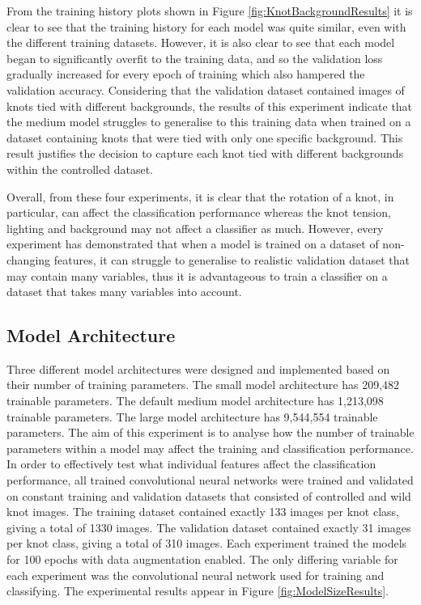 \documentclass{l4proj}
\begin{document}
From the training history plots shown in Figure \ref{fig:KnotBackgroundResults} it is clear to see that the training history for each model was quite similar, even with the different training datasets. However, it is also clear to see that each model began to significantly overfit to the training data, and so the validation loss gradually increased for every epoch of training which also hampered the validation accuracy. Considering that the validation dataset contained images of knots tied with different backgrounds, the results of this experiment indicate that the medium model struggles to generalise to this training data when trained on a dataset containing knots that were tied with only one specific background. This result justifies the decision to capture each knot tied with different backgrounds within the controlled dataset.

Overall, from these four experiments, it is clear that the rotation of a knot, in particular, can affect the classification performance whereas the knot tension, lighting and background may not affect a classifier as much. However, every experiment has demonstrated that when a model is trained on a dataset of non-changing features, it can struggle to generalise to realistic validation dataset that may contain many variables, thus it is advantageous to train a classifier on a dataset that takes many variables into account.  

\subsection{Model Architecture}
Three different model architectures were designed and implemented based on their number of training parameters.
The small model architecture has 209,482 trainable parameters.
The default medium model architecture has 1,213,098 trainable parameters.
The large model architecture has 9,544,554 trainable parameters.
The aim of this experiment is to analyse how the number of trainable parameters within a model may affect the training and classification performance.
In order to effectively test what individual features affect the classification performance, all trained convolutional neural networks were trained and validated on constant training and validation datasets that consisted of controlled and wild knot images.
The training dataset contained exactly 133 images per knot class, giving a total of 1330 images.
The validation dataset contained exactly 31 images per knot class, giving a total of 310 images.
Each experiment trained the models for 100 epochs with data augmentation enabled.
The only differing variable for each experiment was the convolutional neural network used for training and classifying.
The experimental results appear in Figure \ref{fig:ModelSizeResults}.
\end{document}
